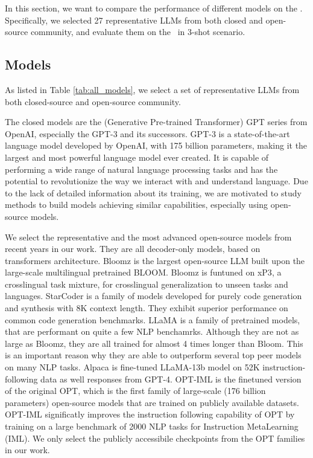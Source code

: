 

In this section, we want to compare the performance of different models on the \snact. Specifically, we selected 27 representative LLMs from both closed and open-source community, and evaluate them on the \snact~in 3-shot scenario.

\subsection{Models}


As listed in Table \ref{tab:all_models}, we select a set of representative LLMs from both closed-source and open-source community.

The closed models are the (Generative Pre-trained Transformer) GPT series from OpenAI, especially the GPT-3\cite{brown2020language} and its successors\cite{OpenAI2023-ov}. GPT-3 is a state-of-the-art language model developed by OpenAI, with 175 billion parameters, making it the largest and most powerful language model ever created. It is capable of performing a wide range of natural language processing tasks and has the potential to revolutionize the way we interact with and understand language. Due to the lack of detailed information about its training, we are motivated to study methods to build models achieving similar capabilities, especially using open-source models.

We select the representative and the most advanced open-source models from recent years in our work. They are all decoder-only models, based on transformers\cite{vaswani2017attention} architecture. 
Bloomz\cite{muennighoff2022crosslingual} is the largest open-source LLM built upon the large-scale multilingual pretrained BLOOM\cite{bigscience_workshop_2022}. Bloomz is funtuned on xP3\cite{muennighoff2022crosslingual}, a crosslingual task mixture, for crosslingual generalization to unseen tasks and languages. 
StarCoder\cite{li2023starcoder} is a family of models developed for purely code generation and synthesis with 8K context length. They exhibit superior performance on common code generation benchmarks. 
LLaMA\cite{touvron2023llama} is a family of pretrained models, that are performant on quite a few NLP benchamrks. Although they are not as large as Bloomz, they are all trained for almost 4 times longer than Bloom. This is an important reason why they are able to outperform several top peer models on many NLP tasks. Alpaca \cite{chavinlo-gpt4-x-alpaca, alpaca} is fine-tuned LLaMA-13b model on 52K instruction-following data as well responses from GPT-4. 
OPT-IML\cite{iyer2022opt} is the finetuned version of the original OPT\cite{zhang2022opt}, which is the first family of large-scale (176 billion parameters) open-source models that are trained on publicly available datasets. OPT-IML significatly improves the instruction following capability of OPT by training on a large benchmark of 2000 NLP tasks for Instruction MetaLearning (IML). We only select the publicly accessibile checkpoints from the OPT families in our work.

